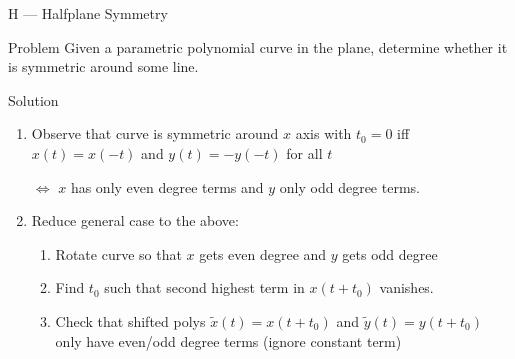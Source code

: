 \renewcommand{\insertshortauthor}{Problem Author: Per Austrin}
\begin{frame}[fragile]{H --- Halfplane Symmetry}

  \begin{block}{Problem}
    Given a parametric polynomial curve in the plane, determine whether it is symmetric around some line.
  \end{block}

  \begin{block}{Solution}
    \begin{enumerate}
    \item Observe that curve is symmetric around $x$ axis with $t_0=0$ iff $x(t) = x(-t)$ and $y(t) = -y(-t)$ for all $t$

      $\Leftrightarrow$  $x$ has only even degree terms and $y$ only odd degree terms.

    \item Reduce general case to the above:

      \begin{enumerate}
      \item Rotate curve so that $x$ gets even degree and $y$ gets odd degree

      \item Find $t_0$ such that second highest term in $x(t+t_0)$ vanishes.

      \item Check that shifted polys $\tilde{x}(t) = x(t+t_0)$ and $\tilde{y}(t) = y(t+t_0)$ only have even/odd degree terms (ignore constant term)
      \end{enumerate}
    \end{enumerate}
  \end{block}


\end{frame}
